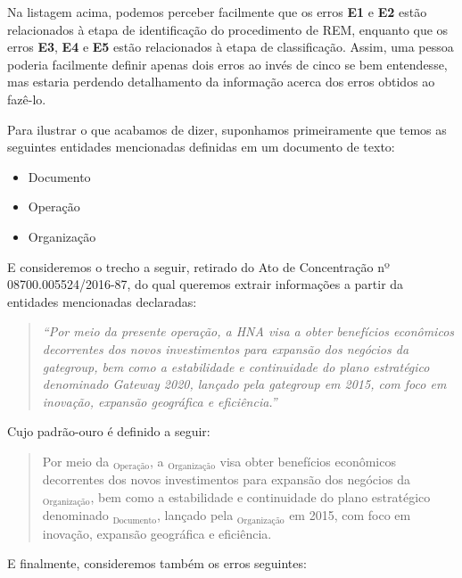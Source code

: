 \documentclass[11pt]{report}
\newcommand{\quotes}[1]{``#1''}
\begin{document}
Na listagem acima, podemos perceber facilmente que os erros \textbf{E1} e \textbf{E2} estão relacionados à etapa de identificação do procedimento de REM, enquanto que
os erros \textbf{E3}, \textbf{E4} e \textbf{E5} estão relacionados à etapa de classificação. Assim, uma pessoa poderia facilmente definir apenas dois erros ao invés
de cinco se bem entendesse, mas estaria perdendo detalhamento da informação acerca dos erros obtidos ao fazê-lo.

Para ilustrar o que acabamos de dizer, suponhamos primeiramente que temos as seguintes entidades mencionadas definidas em um documento de texto:

\begin{itemize}
  \item Documento
  \item Operação
  \item Organização
\end{itemize}

E consideremos o trecho a seguir, retirado do Ato de Concentração nº 08700.005524/2016-87, do qual queremos extrair informações a partir da entidades mencionadas
declaradas:

\begin{quote}
  \textit{\quotes{Por meio da presente operação, a HNA visa a obter benefícios econômicos decorrentes dos novos investimentos para expansão dos negócios da gategroup,
  bem como a  estabilidade e  continuidade do plano estratégico denominado Gateway 2020, lançado pela gategroup em 2015, com foco em inovação, expansão geográfica e eficiência.}}
\end{quote}

Cujo padrão-ouro é definido a seguir:

\begin{quote}
  \begin{varwidth}{0.89\textwidth}
  Por meio da $_{\text{Operação}}$, a $_{\text{Organização}}$ visa obter benefícios econômicos decorrentes dos novos investimentos para
  expansão dos negócios da $_{\text{Organização}}$, bem como a
  estabilidade e  continuidade do plano estratégico denominado $_{\text{Documento}}$, lançado pela $_{\text{Organização}}$ em 2015,
  com foco em inovação, expansão geográfica e eficiência.
  \end{varwidth}
\end{quote}

E finalmente, consideremos também os erros seguintes:
\end{document}
